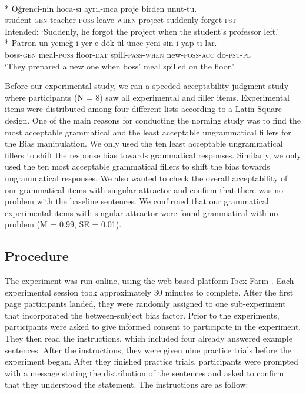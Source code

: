 \ea \label{ex:fillers}
   \label{ex:ungFiller}\\*
  \gll \"O\u{g}renci-nin hoca-s{\i} ayr{\i}l-{\i}nca proje birden unut-tu.\\
  student-\textsc{gen} teacher-\textsc{poss} leave-\textsc{when} project suddenly forget-\textsc{pst}\\
  \glt Intended: `Suddenly, he forgot the project when the student's professor left.'
   \label{ex:grFiller}\\*
  \gll Patron-un yeme\u{g}-i yer-e d\"ok-\"ul-\"unce yeni-sin-i yap-t{\i}-lar.\\
  boss-\textsc{gen} meal-\textsc{poss} floor-\textsc{dat} spill-\textsc{pass}-\textsc{when} new-\textsc{poss}-\textsc{acc} do-\textsc{pst}-\textsc{pl}\\
  \glt `They prepared a new one when boss' meal spilled on the floor.'
  \z
\z





Before our experimental study, we ran a speeded acceptability judgment study where participants (N = 8) saw all experimental and filler items. Experimental items were distributed among four different lists according to a Latin Square design. One of the main reasons for conducting the norming study was to find the most acceptable grammatical and the least acceptable ungrammatical fillers for the Bias manipulation. We only used the ten least acceptable ungrammatical fillers to shift the response bias towards grammatical responses. Similarly, we only used the ten most acceptable grammatical fillers to shift the bias towards ungrammatical responses. We also wanted to check the overall acceptability of our grammatical items with singular attractor and confirm that there was no problem with the baseline sentences. We confirmed that our grammatical experimental items with singular attractor were found grammatical with no problem (M = 0.99, SE = 0.01). 

\subsection{Procedure}

The experiment was run online, using the web-based platform Ibex Farm \citep{Drummond2013}. Each experimental session took approximately 30 minutes to complete. After the first page participants landed, they were randomly assigned to one sub-experiment that incorporated the between-subject bias factor. Prior to the experiments, participants were asked to give informed consent to participate in the experiment. They then read the instructions, which included four already answered example sentences. After the instructions, they were given nine practice trials before the experiment began. After they finished practice trials, participants were prompted with a message stating the distribution of the sentences and asked to confirm that they understood the statement. The instructions are as follow:


